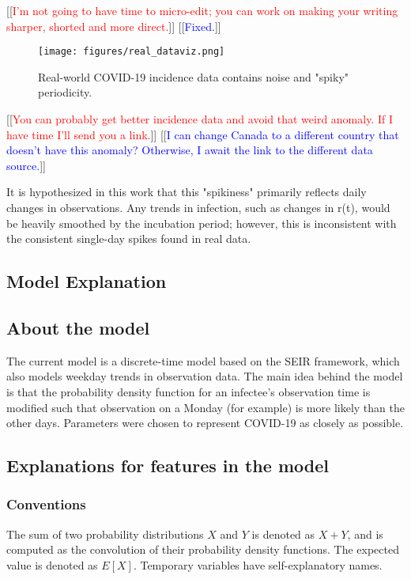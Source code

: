 \documentclass{article}
\newcommand{\jd}[1]{[[\textcolor{red}{#1}]]}  \newcommand{\msComment}[1]{[[\textcolor{blue}{#1}]]}
\newcommand{\jd}[1]{} \newcommand{\msComment}[1]{}
\begin{document}
\jd{I'm not going to have time to micro-edit; you can work on making your writing sharper, shorted and more direct.} \msComment{Fixed.}

\clearpage
\begin{figure}[h!]
\centering
\texttt{[image: figures/real\_dataviz.png]}
\caption{Real-world COVID-19 incidence data contains noise and "spiky" periodicity. \cite{OWID}}
\end{figure}
\jd{You can probably get better incidence data and avoid that weird anomaly. If I have time I'll send you a link.} \msComment{I can change Canada to a different country that doesn't have this anomaly? Otherwise, I await the link to the different data source.}


It is hypothesized in this work that this "spikiness" primarily reflects daily changes in observations. Any trends in infection, such as changes in r(t), would be heavily smoothed by the incubation period; however, this is inconsistent with the consistent single-day spikes found in real data.

\subsection{Model Explanation}

\subsection{About the model}
The current model is a discrete-time model based on the SEIR framework, which also models weekday trends in observation data. The main idea behind the model is that the probability density function for an infectee's observation time is modified such that observation on a Monday (for example) is more likely than the other days. Parameters were chosen to represent COVID-19 as closely as possible.

\subsection{Explanations for features in the model}

\subsubsection{Conventions}
The sum of two probability distributions $X$ and $Y$ is denoted as $X+Y$, and is computed as the convolution of their probability density functions. The expected value is denoted as $E[X]$. Temporary variables have self-explanatory names.
\end{document}
